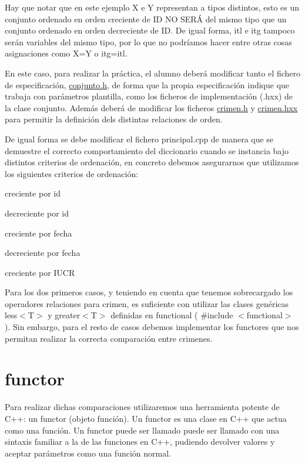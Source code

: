 Hay que notar que en este ejemplo X e Y representan a tipos distintos, esto es un conjunto ordenado en orden creciente de I\+D N\+O S\+E\+RÁ del mismo tipo que un conjunto ordenado en orden decreciente de I\+D. De igual forma, itl e itg tampoco serán variables del mismo tipo, por lo que no podríamos hacer entre otras cosas asignaciones como X=Y o itg=itl.

En este caso, para realizar la práctica, el alumno deberá modificar tanto el fichero de especificación, \hyperlink{conjunto_8h_source}{conjunto.\+h}, de forma que la propia especificación indique que trabaja con parámetros plantilla, como los ficheros de implementación (.hxx) de la clase conjunto. Además deberá de modificar los ficheros \hyperlink{crimen_8h_source}{crimen.\+h} y \hyperlink{crimen_8hxx_source}{crimen.\+hxx} para permitir la definición dels distintas relaciones de orden.

De igual forma se debe modificar el fichero principal.\+cpp de manera que se demuestre el correcto comportamiento del diccionario cuando se instancia bajo distintos criterios de ordenación, en concreto debemos asegurarnos que utilizamos los siguientes criterios de ordenación\+:

\begin{DoxyItemize}
\item creciente por id \item decreciente por id \item creciente por fecha \item decreciente por fecha \item creciente por I\+U\+C\+R\end{DoxyItemize}
Para los dos primeros casos, y teniendo en cuenta que tenemos sobrecargado los operadores relaciones para crimen, es suficiente con utilizar las clases genéricas less$<$\+T$>$ y greater$<$\+T$>$ definidas en functional ( \#include $<$functional$>$ ). Sin embargo, para el resto de casos debemos implementar los functores que nos permitan realizar la correcta comparación entre crimenes.\hypertarget{index_functor}{}\section{functor}\label{index_functor}
Para realizar dichas comparaciones utilizaremos una herramienta potente de C++\+: un functor (objeto función). Un functor es una clase en C++ que actua como una función. Un functor puede ser llamado puede ser llamado con una sintaxis familiar a la de las funciones en C++, pudiendo devolver valores y aceptar parámetros como una función normal.

